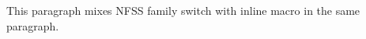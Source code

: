 This paragraph mixes NFSS family switch \rmfamily with inline \textrm{macro} in the same paragraph.

